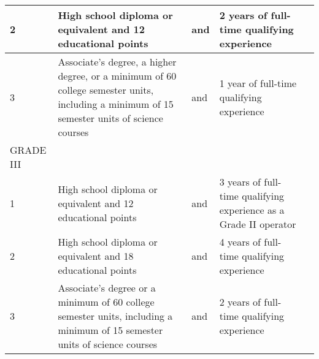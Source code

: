 \documentclass[10pt]{article}
\begin{document}
\begin{table}[]
\begin{tabular}{|l|l|l|l|l|}
2         & High  school  diploma    or  equivalent  and    12 educational points                                                                                                                                                                                                                         & and & 2    years    of      full-time    qualifying   experience                                      &  \\ \hline
3         & Associate’s  degree,  a    higher  degree,  or  a   minimum   of   60     college   semester   units, including a minimum of 15 semester   units of science courses                                                                                                                           & and & 1     year     of       full-time     qualifying   experience                                   &  \\ \hline
GRADE III &                                                                                                                                                                                                                                                                                               &     &                                                                                                 &  \\ \hline
1         & High  school  diploma    or  equivalent  and    12 educational points                                                                                                                                                                                                                         & and & 3    years    of      full-time    qualifying   experience as a Grade II operator               &  \\ \hline
2         & High  school  diploma    or  equivalent  and    18 educational points                                                                                                                                                                                                                         & and & 4    years    of      full-time    qualifying   experience                                      &  \\ \hline
3         & Associate’s  degree  or    a  minimum   of     60 college semester units, including a minimum of 15 semester units of   science courses                                                                                                                                                       & and & 2    years    of      full-time    qualifying   experience                                      &  \\ \hline

\end{tabular}
\end{table}
\end{document}
